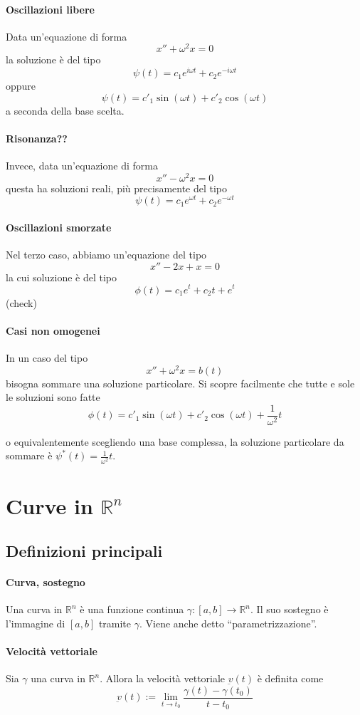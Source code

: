 \documentclass[a4paper,12pt]{article}
\begin{document}
\paragraph{Oscillazioni libere}
Data un'equazione di forma
$$x''+\omega^2 x=0$$
la soluzione è del tipo
$$\psi(t) = c_1 e^{i\omega t} + c_2 e^{-i\omega t}$$
oppure
$$\psi(t) = c'_1\sin(\omega t) + c'_2\cos(\omega t)$$
a seconda della base scelta.

\paragraph{Risonanza??}
Invece, data un'equazione di forma
$$x''-\omega^2 x=0$$
questa ha soluzioni reali, più precisamente del tipo
$$\psi(t) = c_1 e^{\omega t} + c_2 e^{-\omega t}$$

\paragraph{Oscillazioni smorzate}
Nel terzo caso, abbiamo un'equazione del tipo
$$x''-2x +x=0$$
la cui soluzione è del tipo
$$\phi(t) = c_1e^t +c_2 t + e^t$$
(check)

\paragraph{Casi non omogenei}
In un caso del tipo
$$x''+\omega^2 x=b(t)$$
bisogna sommare una soluzione particolare. Si scopre facilmente che tutte e sole le soluzioni sono fatte
$$\phi(t) = c'_1\sin(\omega t) + c'_2\cos(\omega t) + \frac{1}{\omega^2}t$$

o equivalentemente scegliendo una base complessa, la soluzione particolare da sommare è $\psi^*(t) = \frac{1}{\omega^2}t$.

\section{Curve in $\mathbb{R}^n$}
\subsection{Definizioni principali}
\paragraph{Curva, sostegno}
Una curva in $\mathbb{R}^n$ è una funzione continua $\gamma:[a,b]\rightarrow\mathbb{R}^n$.
Il suo sostegno è l'immagine di $[a,b]$ tramite $\gamma$. Viene anche detto ``parametrizzazione''.
\paragraph{Velocità vettoriale}
Sia $\gamma$ una curva in $\mathbb{R}^n$. Allora la velocità vettoriale $\underbar{v}(t)$ è definita come
$$\underbar{v}(t) := \lim_{t\to t_0} \dfrac{\gamma(t)-\gamma(t_0)}{t-t_0}$$
\end{document}

